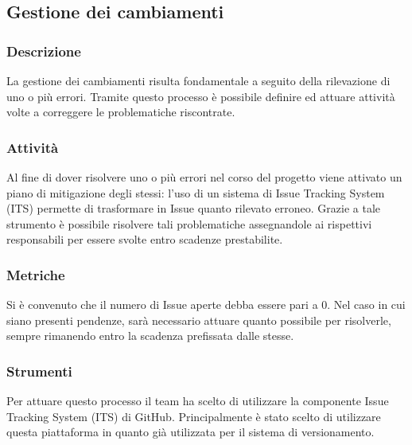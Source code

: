 \subsection{Gestione dei cambiamenti}
	
	\subsubsection{Descrizione}
		La gestione dei cambiamenti risulta fondamentale a seguito della rilevazione di uno o più errori. Tramite questo processo è possibile definire ed attuare attività volte a correggere le problematiche riscontrate.
	
	
	\subsubsection{Attività}
			Al fine di dover risolvere uno o più errori nel corso del progetto viene attivato un piano di mitigazione degli stessi: l'uso di un sistema di Issue Tracking System (ITS) permette di trasformare in Issue quanto rilevato erroneo. Grazie a tale strumento è possibile risolvere tali problematiche assegnandole ai rispettivi responsabili per essere svolte entro scadenze prestabilite.
	
	
	\subsubsection{Metriche}
			Si è convenuto che il numero di Issue aperte debba essere pari a 0. Nel caso in cui siano presenti pendenze, sarà necessario attuare quanto possibile per risolverle, sempre rimanendo entro la scadenza prefissata dalle stesse.
			
			
	\subsubsection{Strumenti}
			Per attuare questo processo il team ha scelto di utilizzare la componente Issue Tracking System (ITS) di GitHub. Principalmente è stato scelto di utilizzare questa piattaforma in quanto già utilizzata per il sistema di versionamento.
